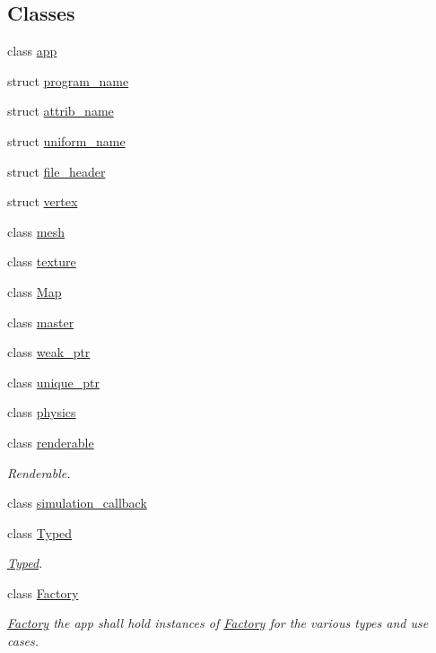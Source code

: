 \subsection*{\-Classes}
\begin{DoxyCompactItemize}
\item 
class \hyperlink{classNeb_1_1app}{app}
\item 
struct \hyperlink{structNeb_1_1program__name}{program\-\_\-name}
\item 
struct \hyperlink{structNeb_1_1attrib__name}{attrib\-\_\-name}
\item 
struct \hyperlink{structNeb_1_1uniform__name}{uniform\-\_\-name}
\item 
struct \hyperlink{structNeb_1_1file__header}{file\-\_\-header}
\item 
struct \hyperlink{structNeb_1_1vertex}{vertex}
\item 
class \hyperlink{classNeb_1_1mesh}{mesh}
\item 
class \hyperlink{classNeb_1_1texture}{texture}
\item 
class \hyperlink{classNeb_1_1Map}{\-Map}
\item 
class \hyperlink{classNeb_1_1master}{master}
\item 
class \hyperlink{classNeb_1_1weak__ptr}{weak\-\_\-ptr}
\item 
class \hyperlink{classNeb_1_1unique__ptr}{unique\-\_\-ptr}
\item 
class \hyperlink{classNeb_1_1physics}{physics}
\item 
class \hyperlink{classNeb_1_1renderable}{renderable}
\begin{DoxyCompactList}\small\item\em \-Renderable. \end{DoxyCompactList}\item 
class \hyperlink{classNeb_1_1simulation__callback}{simulation\-\_\-callback}
\item 
class \hyperlink{classNeb_1_1Typed}{\-Typed}
\begin{DoxyCompactList}\small\item\em \hyperlink{classNeb_1_1Typed}{\-Typed}. \end{DoxyCompactList}\item 
class \hyperlink{classNeb_1_1Factory}{\-Factory}
\begin{DoxyCompactList}\small\item\em \hyperlink{classNeb_1_1Factory}{\-Factory} the app shall hold instances of \hyperlink{classNeb_1_1Factory}{\-Factory} for the various types and use cases. \end{DoxyCompactList}\item 

\end{DoxyCompactItemize}
